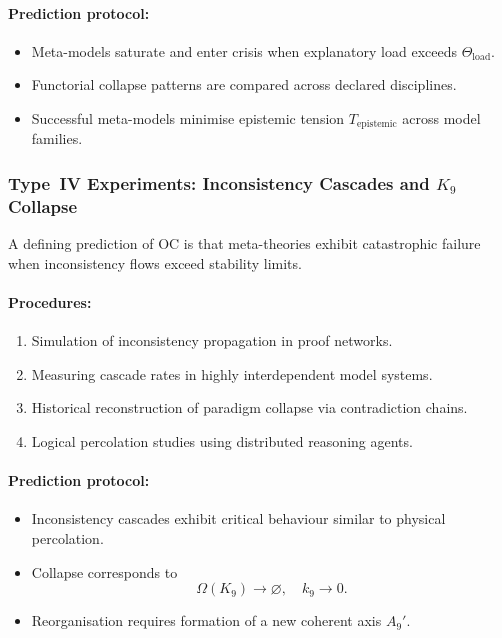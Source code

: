 \paragraph{Prediction protocol:}

\begin{itemize}
    \item Meta-models saturate and enter crisis when 
          explanatory load exceeds $\Theta_{\mathrm{load}}$.
    \item Functorial collapse patterns are compared across declared disciplines.
    \item Successful meta-models minimise epistemic tension 
          $T_{\mathrm{epistemic}}$ across model families.
\end{itemize}



\subsubsection{Type~IV Experiments: Inconsistency Cascades and \texorpdfstring{$K_9$}{K_9} Collapse}

A defining prediction of OC is that meta-theories exhibit 
catastrophic failure when inconsistency flows exceed stability limits.

\paragraph{Procedures:}

\begin{enumerate}
    \item Simulation of inconsistency propagation in proof networks.
    \item Measuring cascade rates in highly interdependent model systems.
    \item Historical reconstruction of paradigm collapse via contradiction chains.
    \item Logical percolation studies using distributed reasoning agents.
\end{enumerate}

\paragraph{Prediction protocol:}

\begin{itemize}
    \item Inconsistency cascades exhibit critical behaviour 
          similar to physical percolation.
    \item Collapse corresponds to 
          \[
              \Omega(K_9) \to \varnothing,\quad k_9 \to 0.
          \]
    \item Reorganisation requires formation of a new coherent axis $A_9'$.
\end{itemize}



